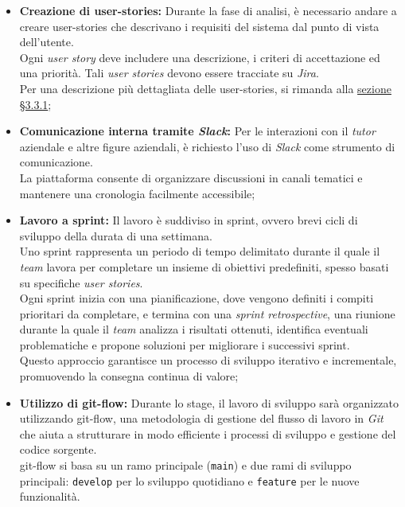 \begin{itemize}
    \item \textbf{Creazione di \gls{user-stories}:} Durante la fase di analisi, è necessario andare a creare \gls{user-stories} che descrivano i requisiti del sistema dal punto di vista dell’utente.\\
    Ogni \textit{user story} deve includere una descrizione, i criteri di accettazione ed una priorità.
    Tali \textit{user stories} devono essere tracciate su \textit{Jira}.\\
    Per una descrizione più dettagliata delle \gls{user-stories}, si rimanda alla \hyperref[subsec:user-story-mapping]{sezione §3.3.1};
    \item \textbf{Comunicazione interna tramite \textit{Slack}:} Per le interazioni con il \textit{tutor} aziendale e altre figure aziendali, è richiesto l’uso di \textit{Slack} come strumento di comunicazione.\\
    La piattaforma consente di organizzare discussioni in canali tematici e mantenere una cronologia facilmente accessibile;
    \item \textbf{Lavoro a \gls{sprint}:} Il lavoro è suddiviso in \gls{sprint}, ovvero brevi cicli di sviluppo della durata di una settimana.\\
    Uno \gls{sprint} rappresenta un periodo di tempo delimitato durante il quale il \textit{team} lavora per completare un insieme di obiettivi predefiniti, spesso basati su specifiche \textit{user stories}. \\
    Ogni \gls{sprint} inizia con una pianificazione, dove vengono definiti i compiti prioritari da completare, e termina con una \textit{sprint retrospective}, 
    una riunione durante la quale il \textit{team} analizza i risultati ottenuti, identifica eventuali problematiche e propone soluzioni per migliorare i successivi \gls{sprint}. \\
    Questo approccio garantisce un processo di sviluppo iterativo e incrementale, promuovendo la consegna continua di valore;
    \item \textbf{Utilizzo di \gls{git-flow}:} Durante lo stage, il lavoro di sviluppo sarà organizzato utilizzando \gls{git-flow}, una metodologia di gestione del flusso di lavoro in \textit{Git} che aiuta a strutturare in modo efficiente i processi di sviluppo e gestione del codice sorgente.\\
    \gls{git-flow} si basa su un ramo principale (\texttt{main}) e due rami di sviluppo principali: \texttt{develop} per lo sviluppo quotidiano e \texttt{feature} per le nuove funzionalità.\\

\end{itemize}
